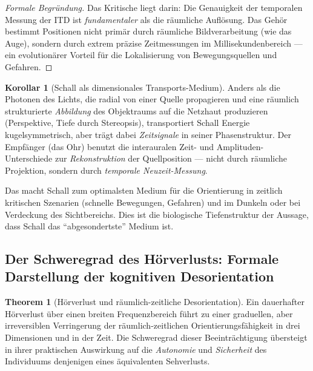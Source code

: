 ﻿\documentclass[12pt, a4paper]{article}
\theoremstyle{definition}
\newtheorem{korollar}{Korollar}[section]
\newtheorem{theorem}{Theorem}[section]
\theoremstyle{remark}
\begin{document}
\begin{proof}[Formale Begründung]
Das Kritische liegt darin: Die Genauigkeit der temporalen Messung der ITD ist \emph{fundamentaler} als die räumliche Auflösung. Das Gehör bestimmt Positionen nicht primär durch räumliche Bildverarbeitung (wie das Auge), sondern durch extrem präzise Zeitmessungen im Millisekundenbereich --- ein evolutionärer Vorteil für die Lokalisierung von Bewegungsquellen und Gefahren.
\end{proof}

\begin{korollar}[Schall als dimensionales Transports-Medium]
Anders als die Photonen des Lichts, die radial von einer Quelle propagieren und eine räumlich strukturierte \emph{Abbildung} des Objektraums auf die Netzhaut produzieren (Perspektive, Tiefe durch Stereopsis), transportiert Schall Energie kugelsymmetrisch, aber trägt dabei \emph{Zeitsignale} in seiner Phasenstruktur. Der Empfänger (das Ohr) benutzt die interauralen Zeit- und Amplituden-Unterschiede zur \emph{Rekonstruktion} der Quellposition --- nicht durch räumliche Projektion, sondern durch \emph{temporale Neuzeit-Messung}.

Das macht Schall zum optimalsten Medium für die Orientierung in zeitlich kritischen Szenarien (schnelle Bewegungen, Gefahren) und im Dunkeln oder bei Verdeckung des Sichtbereichs. Dies ist die biologische Tiefenstruktur der Aussage, dass Schall das ``abgesondertste'' Medium ist.
\end{korollar}

\subsection{Der Schweregrad des Hörverlusts: Formale Darstellung der kognitiven Desorientation}

\begin{theorem}[Hörverlust und räumlich-zeitliche Desorientation]
\label{thm:hearing_loss}
Ein dauerhafter Hörverlust über einen breiten Frequenzbereich führt zu einer graduellen, aber irreversiblen Verringerung der räumlich-zeitlichen Orientierungsfähigkeit in drei Dimensionen und in der Zeit. Die Schweregrad dieser Beeinträchtigung übersteigt in ihrer praktischen Auswirkung auf die \emph{Autonomie} und \emph{Sicherheit} des Individuums denjenigen eines äquivalenten Sehverlusts.
\end{theorem}
\end{document}
